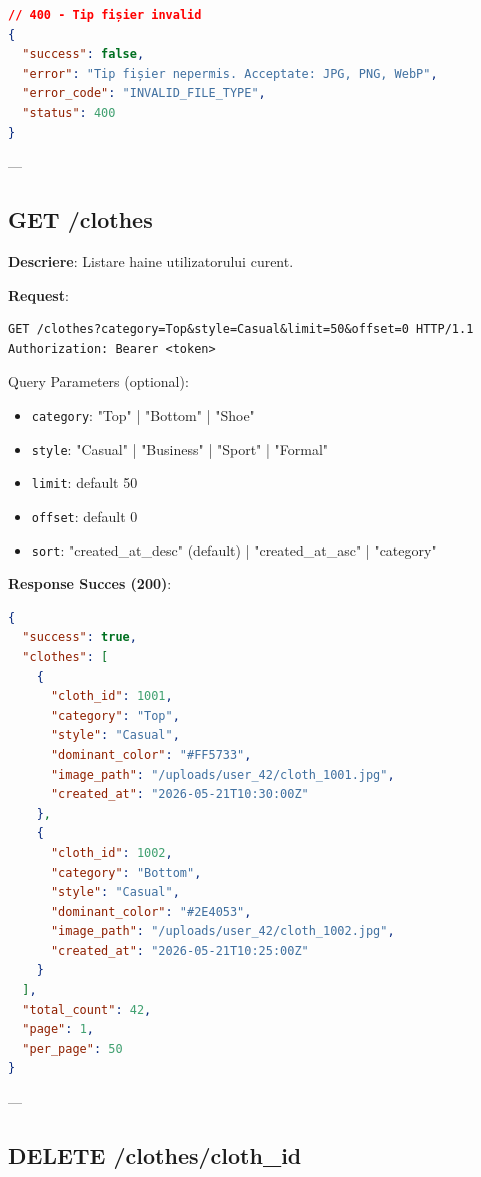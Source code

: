 \begin{lstlisting}[language=JSON]
// 400 - Tip fișier invalid
{
  "success": false,
  "error": "Tip fișier nepermis. Acceptate: JPG, PNG, WebP",
  "error_code": "INVALID_FILE_TYPE",
  "status": 400
}
\end{lstlisting}

---

\subsection{GET /clothes}

\textbf{Descriere}: Listare haine utilizatorului curent.

\textbf{Request}:

\begin{lstlisting}[language=HTTP]
GET /clothes?category=Top&style=Casual&limit=50&offset=0 HTTP/1.1
Authorization: Bearer <token>
\end{lstlisting}

Query Parameters (optional):
\begin{itemize}
    \item \texttt{category}: "Top" | "Bottom" | "Shoe"
    \item \texttt{style}: "Casual" | "Business" | "Sport" | "Formal"
    \item \texttt{limit}: default 50
    \item \texttt{offset}: default 0
    \item \texttt{sort}: "created_at\_desc" (default) | "created_at_asc" | "category"
\end{itemize}

\textbf{Response Succes (200)}:

\begin{lstlisting}[language=JSON]
{
  "success": true,
  "clothes": [
    {
      "cloth_id": 1001,
      "category": "Top",
      "style": "Casual",
      "dominant_color": "#FF5733",
      "image_path": "/uploads/user_42/cloth_1001.jpg",
      "created_at": "2026-05-21T10:30:00Z"
    },
    {
      "cloth_id": 1002,
      "category": "Bottom",
      "style": "Casual",
      "dominant_color": "#2E4053",
      "image_path": "/uploads/user_42/cloth_1002.jpg",
      "created_at": "2026-05-21T10:25:00Z"
    }
  ],
  "total_count": 42,
  "page": 1,
  "per_page": 50
}
\end{lstlisting}

---

\subsection{DELETE /clothes/{cloth\_id}}


